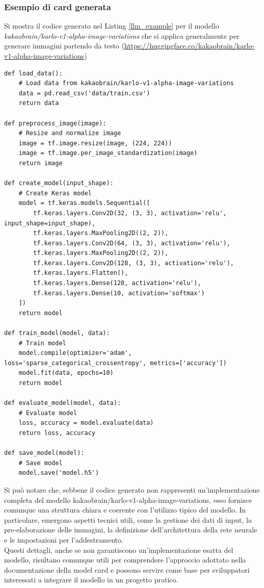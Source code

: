\documentclass{article}
\begin{document}
\subsubsection{Esempio di card generata}
Si mostra il codice generato nel Listing \ref{llm_example}  per il modello \textit{kakaobrain/karlo-v1-alpha-image-variations} che si applica generalmente per generare immagini partendo da testo (\url{https://huggingface.co/kakaobrain/karlo-v1-alpha-image-variations})
\begin{lstlisting}[caption={Esempio di output della generazione}, label={llm_example}]
def load_data():
    # Load data from kakaobrain/karlo-v1-alpha-image-variations
    data = pd.read_csv('data/train.csv')
    return data

def preprocess_image(image):
    # Resize and normalize image
    image = tf.image.resize(image, (224, 224))
    image = tf.image.per_image_standardization(image)
    return image

def create_model(input_shape):
    # Create Keras model
    model = tf.keras.models.Sequential([
        tf.keras.layers.Conv2D(32, (3, 3), activation='relu', input_shape=input_shape),
        tf.keras.layers.MaxPooling2D((2, 2)),
        tf.keras.layers.Conv2D(64, (3, 3), activation='relu'),
        tf.keras.layers.MaxPooling2D((2, 2)),
        tf.keras.layers.Conv2D(128, (3, 3), activation='relu'),
        tf.keras.layers.Flatten(),
        tf.keras.layers.Dense(128, activation='relu'),
        tf.keras.layers.Dense(10, activation='softmax')
    ])
    return model

def train_model(model, data):
    # Train model
    model.compile(optimizer='adam', loss='sparse_categorical_crossentropy', metrics=['accuracy'])
    model.fit(data, epochs=10)
    return model

def evaluate_model(model, data):
    # Evaluate model
    loss, accuracy = model.evaluate(data)
    return loss, accuracy

def save_model(model):
    # Save model
    model.save('model.h5')
\end{lstlisting}
Si può notare che, sebbene il codice generato non rappresenti un'implementazione completa del modello kakaobrain/karlo-v1-alpha-image-variations, esso fornisce comunque una struttura chiara e coerente con l’utilizzo tipico del modello. In particolare, emergono aspetti tecnici utili, come la gestione dei dati di input, la pre-elaborazione delle immagini, la definizione dell’architettura della rete neurale e le impostazioni per l’addestramento.\\
Questi dettagli, anche se non garantiscono un’implementazione esatta del modello, risultano comunque utili per comprendere l’approccio adottato nella documentazione della model card e possono servire come base per sviluppatori interessati a integrare il modello in un progetto pratico.
\end{document}
